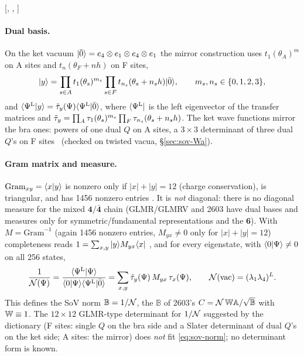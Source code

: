 [, , ]

\paragraph{Dual basis.} On the ket vacuum $|\bar0\rangle=e_4\otimes e_1\otimes e_4\otimes e_1$ the mirror construction uses $t_1(\theta_A)^m$ on A sites and $t_n(\theta_F+nh)$ on F sites,
\begin{equation}\label{eq:sov-ketwords}
 |y\rangle=\prod_{s\in A}t_1(\theta_s)^{m_s}\prod_{s\in F}t_{n_s}(\theta_s+n_sh)|\bar0\rangle,\qquad m_s,n_s\in\{0,1,2,3\},
\end{equation}
and $\langle\Psi^{\mathrm L}|y\rangle=\tilde\tau_y(\Psi)\langle\Psi^{\mathrm L}|\bar0\rangle$, where $\langle\Psi^{\mathrm L}|$ is the left eigenvector of the transfer matrices and
$\tilde\tau_y=\prod_A\tau_1(\theta_s)^{m_s}\prod_F\tau_{n_s}(\theta_s+n_sh)$. The ket wave functions mirror the bra ones: powers of one dual $Q$ on A sites, a $3\times3$
determinant of three dual $Q$'s on F sites \ex\ (checked on twisted vacua, \S\ref{sec:sov-Wa}).

\paragraph{Gram matrix and measure.} $\mathrm{Gram}_{xy}=\langle x|y\rangle$ is nonzero only if $|x|+|y|=12$ (charge conservation), is triangular, and has 1456 nonzero entries \ex.
It is \emph{not} diagonal: there is no diagonal measure for the mixed $\mathbf4/\bar{\mathbf4}$ chain (GLMR/GLMRV and 2603 have dual bases and measures only for symmetric/fundamental representations and the $\mathbf 6$). With $M=\mathrm{Gram}^{-1}$ (again 1456 nonzero entries, $M_{yx}\ne0$ only for $|x|+|y|=12$)
completeness reads $1=\sum_{x,y}|y\rangle M_{yx}\langle x|$ \ex, and for every eigenstate, with $\langle0|\Psi\rangle\ne0$ on all 256 states,
\begin{equation}\label{eq:sov-norm}
 \frac1{\mathcal N(\Psi)}=\frac{\langle\Psi^{\mathrm L}|\Psi\rangle}{\langle0|\Psi\rangle\langle\Psi^{\mathrm L}|\bar0\rangle}=\sum_{x,y}\tilde\tau_y(\Psi)\,M_{yx}\,\tau_x(\Psi),\qquad\mathcal N(\mathrm{vac})=(\lambda_1\lambda_4)^L .
\end{equation}
This defines the SoV norm $\mathbb B=1/\mathcal N$, the $\mathbb B$ of 2603's $C=\mathcal N\,\mathbb W\mathbb A/\sqrt{\mathbb B}$ with $\mathbb W\equiv1$. The $12\times12$ GLMR-type determinant for $1/\mathcal N$ suggested by the dictionary
(F sites: single $Q$ on the bra side and a Slater determinant of dual $Q$'s on the ket side; A sites: the mirror) does \emph{not} fit \eqref{eq:sov-norm}; no determinant form is known.


